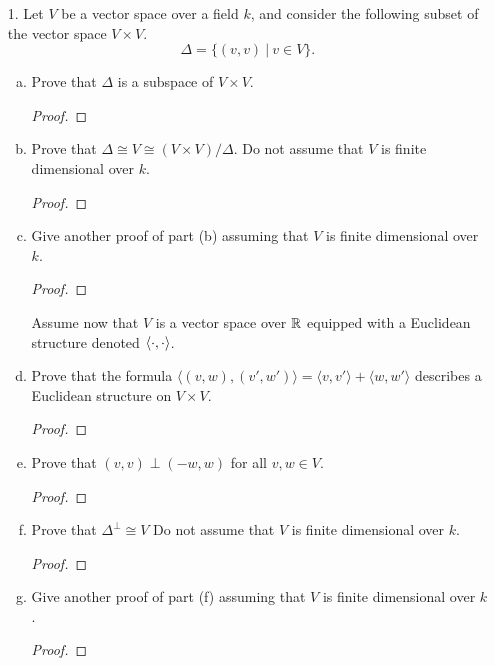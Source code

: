 
\begin{itemize}

\item[1.] Let $V$ be a vector space over a field $k$, and consider the following subset of the
vector space $V \times V$.
$$\Delta = \{(v,v) \ | \ v \in V\}.$$

\begin{enumerate}[(a)]
    \item Prove that $\Delta$ is a subspace of $V \times V$.
    \begin{proof}

    \end{proof}
    
    \item Prove that $\Delta \cong V \cong (V \times V)/\Delta$. Do not assume that $V$ is finite dimensional over $k$.
    \begin{proof}

    \end{proof}
    
    \item Give another proof of part (b) assuming that $V$ is finite dimensional over $k$.
    \begin{proof}

    \end{proof}

Assume now that $V$ is a vector space over $\mathbb{R}$ equipped with a Euclidean structure denoted $\langle{}\cdot,\cdot\rangle$.

    \item Prove that the formula $\langle(v, w),(v',w')\rangle = \langle v,v' \rangle + \langle w,w' \rangle$ describes a Euclidean structure on $V \times V$.
    \begin{proof}

    \end{proof}
    
    \item Prove that $(v, v) \perp (-w, w)$ for all $v, w \in V$.
    \begin{proof}

    \end{proof}
    
    \item Prove that $\Delta^{\perp} \cong V$ Do not assume that $V$ is finite dimensional over $k$.
    \begin{proof}

    \end{proof}
    
    \item Give another proof of part (f) assuming that $V$ is finite dimensional over $k$.
    \begin{proof}


\end{proof}
\end{enumerate}
\end{itemize}
